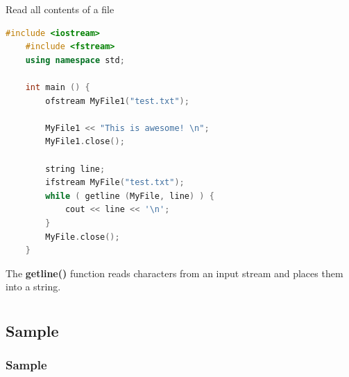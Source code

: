 \documentclass[12pt , a4paper]{article}
\newcommand{\hl}[1]{\colorbox{coolblack}{\color{cream}\textbf{#1}\color{black}}}
\begin{document}
	\begin{problemDefBox}
	Read all contents of a file
	\end{problemDefBox} 

	\begin{lstlisting}[language=C++]
	#include <iostream>
	#include <fstream>
	using namespace std;
	
	int main () {
	    ofstream MyFile1("test.txt");
	    
	    MyFile1 << "This is awesome! \n";
	    MyFile1.close();
	
	    string line;
	    ifstream MyFile("test.txt");
	    while ( getline (MyFile, line) ) {
	        cout << line << '\n';
	    }
	    MyFile.close();
	}		
	\end{lstlisting}
The \hl{getline()} function reads characters from an input stream and places them into a string.
%
%

%
%

%
%
\section{}
	\subsection{Sample}

	\subsubsection{Sample}
\end{document}
